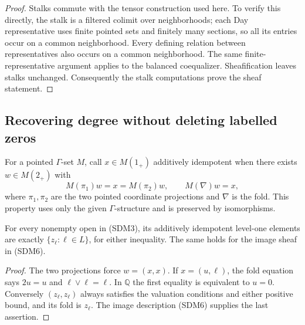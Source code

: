 \begin{proof}
Stalks commute with the tensor construction used here. To verify
this directly, the stalk is a filtered colimit over neighborhoods;
each Day representative uses finite pointed sets and finitely many
sections, so all its entries occur on a common neighborhood.
Every defining relation between representatives also occurs on a
common neighborhood. The same finite-representative argument applies
to the balanced coequalizer. Sheafification leaves stalks unchanged.
Consequently the stalk computations prove the sheaf statement.
\end{proof}

\subsection{Recovering degree without deleting labelled zeros}
For a pointed $\Gamma$-set $M$, call $x\in M(1_+)$ additively
idempotent when there exists $w\in M(2_+)$ with
\begin{equation}\tag{SDM9}
 M(\pi_1)w=x=M(\pi_2)w,\qquad M(\nabla)w=x,
\end{equation}
where $\pi_1,\pi_2$ are the two pointed coordinate projections
and $\nabla$ is the fold. This property uses only the given
$\Gamma$-structure and is preserved by isomorphisms.

\begin{lemma}\label{SDM:idempotents}
For every nonempty open in (SDM3), its additively idempotent
level-one elements are exactly $\{z_\ell:\ell\in L\}$, for either
inequality. The same holds for the image sheaf in (SDM6).
\end{lemma}
\begin{proof}
The two projections force $w=(x,x)$. If $x=(u,\ell)$, the fold
equation says $2u=u$ and $\ell\vee\ell=\ell$. In $\mathbb Q$
the first equality is equivalent to $u=0$. Conversely $(z_\ell,z_\ell)$
always satisfies the valuation conditions and either positive bound,
and its fold is $z_\ell$. The image description (SDM6) supplies the
last assertion.
\end{proof}


